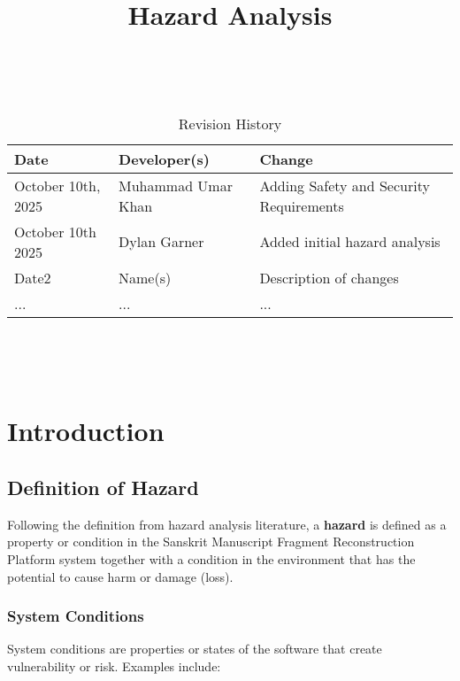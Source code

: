 \documentclass{article}
\title{Hazard Analysis\\\progname}
\author{\authname}
\date{}
\begin{document}
\maketitle
\thispagestyle{empty}

~\newpage


\begin{table}[hp]
\caption{Revision History} \label{TblRevisionHistory}
\begin{tabularx}{\textwidth}{llX}
\toprule
\textbf{Date} & \textbf{Developer(s)} & \textbf{Change}\\
\midrule
October 10th, 2025 & Muhammad Umar Khan & Adding Safety and Security Requirements\\
October 10th 2025 & Dylan Garner & Added initial hazard analysis\\
Date2 & Name(s) & Description of changes\\
... & ... & ...\\
\bottomrule
\end{tabularx}
\end{table}

~\newpage

\tableofcontents

~\newpage



\section{Introduction}

\subsection{Definition of Hazard}

Following the definition from hazard analysis literature, a \textbf{hazard} is defined as a property or condition in the Sanskrit Manuscript Fragment Reconstruction Platform system together with a condition in the environment that has the potential to cause harm or damage (loss).

\subsubsection{System Conditions}

System conditions are properties or states of the software that create vulnerability or risk. Examples include:
\end{document}
